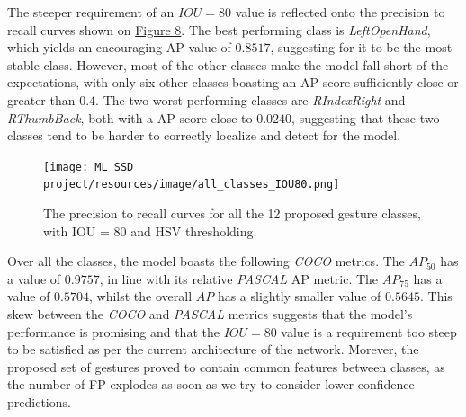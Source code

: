 \documentclass[10pt,twocolumn,letterpaper]{article}
\begin{document}
\begin{flushleft}
The steeper requirement of an $IOU=80$ value is reflected onto the precision to recall curves shown on \hyperref[figure8]{Figure 8}. The best performing class is \textit{LeftOpenHand}, which yields an encouraging AP value of $0.8517$, suggesting for it to be the most stable class. However, most of the other classes make the model fall short of the expectations, with only six other classes boasting an AP score sufficiently close or greater than $0.4$. The two worst performing classes are \textit{RIndexRight} and \textit{RThumbBack}, both with a AP score close to $0.0240$, suggesting that these two classes tend to be harder to correctly localize and detect for the model.
\begin{figure}[!h]
    \centering
    \texttt{[image: ML SSD project/resources/image/all\_classes\_IOU80.png]}
    \caption{The precision to recall curves for all the 12 proposed gesture classes, with IOU = 80 and HSV thresholding.}
\end{figure}
\label{figure8}

Over all the classes, the model boasts the following \textit{COCO} metrics. The $AP_{50}$ has a value of $0.9757$, in line with its relative \textit{PASCAL} AP metric. The $AP_{75}$ has a value of $0.5704$, whilst the overall $AP$ has a slightly smaller value of $0.5645$. This skew between the \textit{COCO} and \textit{PASCAL} metrics suggests that the model's performance is promising and that the $IOU=80$ value is a requirement too steep to be satisfied as per the current architecture of the network. Morever, the proposed set of gestures proved to contain common features between classes, as the number of FP explodes as soon as we try to consider lower confidence predictions.

\end{flushleft}
\end{document}
